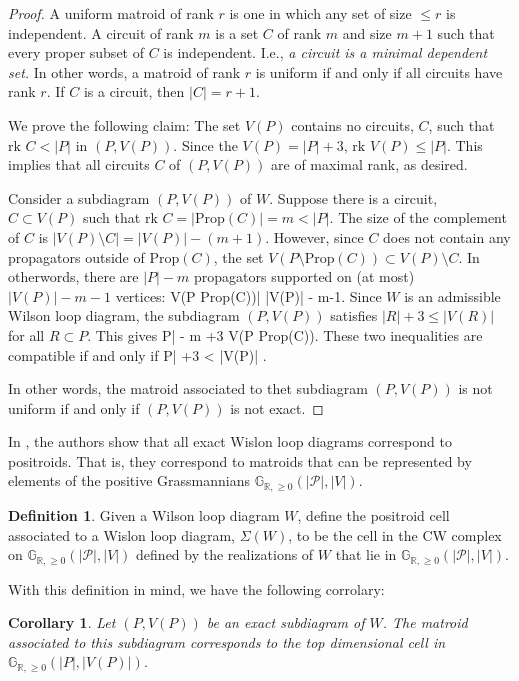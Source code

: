 \documentclass[11pt]{article}
\newcommand{\R}{\mathbb{R}}
\newcommand{\Gr}{\mathbb{G}_{\R, \geq 0}}
\newcommand{\rk}{\textrm{rk }}
\def\bas #1\eas{\begin{align*} #1 \end{align*}}
\newcommand{\cP}{\mathcal{P}}
\newcommand{\Prop}{\textrm{Prop}}
\newtheorem{cor}[thm]{Corollary}
\theoremstyle{remark}
\theoremstyle{definition}
\newtheorem{dfn}[thm]{Definition}
\begin{document}
\begin{proof}
A uniform matroid of rank $r$ is one in which any set of size $ \leq r$ is independent. A circuit of rank $m$ is a set $C$ of rank $m$ and size $m+1$ such that every proper subset of $C$ is independent. I.e., \emph{a circuit is a minimal dependent set.} In other words, a matroid of rank $r$ is uniform if and only if all circuits have rank $r$. If $C$ is a circuit, then $|C| = r+1$.

We prove the following claim: The set $V(P)$ contains no circuits, $C$, such that  $\rk C< |P|$ in $(P, V(P))$. Since the $V(P) = |P|+3$, $\rk V(P) \leq |P|$. This implies that all circuits $C$ of $(P, V(P))$ are of maximal rank, as desired.

Consider a subdiagram $(P, V(P))$ of $W$. Suppose there is a circuit, $C \subset V(P)$ such that $\rk C = |\Prop (C) | = m < |P|$. The size of the complement of $C$ is $|V(P) \setminus C| = |V(P)| -(m+1)$. However, since $C$ does not contain any propagators outside of $\Prop (C)$, the set $V(P \setminus \Prop(C)) \subset V(P )\setminus C$. In otherwords, there are $|P| - m$ propagators supported on (at most) $|V(P)|-m -1$ vertices: \bas |V(P \setminus \Prop (C))| \leq |V(P)| - m-1\;. \eas Since $W$ is an admissible Wilson loop diagram, the subdiagram $(P, V(P))$ satisfies $|R| +3 \leq |V(R)|$ for all $R \subset P$.  This gives \bas |P| - m +3 \leq V(P \setminus \Prop(C))\;. \eas These two inequalities are compatible if and only if \bas |P| +3 < |V(P)| \;. \eas

In other words, the matroid associated to thet subdiagram $(P, V(P))$ is not uniform if and only if $(P, V(P))$ is not exact.
\end{proof}

In \cite{wilsonloops}, the authors show that all exact Wislon loop diagrams correspond to positroids. That is, they correspond to matroids that can be represented by elements of the positive Grassmannians $\Gr(|\cP|, |V|)$.

\begin{dfn}
Given a Wilson loop diagram $W$, define the positroid cell associated to a Wislon loop diagram, $\Sigma(W)$, to be the cell in the CW complex on $\Gr(|\cP|, |V|)$ defined by the realizations of $W$ that lie in $\Gr(|\cP|, |V|)$.
\end{dfn}

With this definition in mind, we have the following corrolary:

\begin{cor}
Let $(P, V(P))$ be an exact subdiagram of $W$. The matroid associated to this subdiagram corresponds to the top dimensional cell in $\Gr(|P|, |V(P)|)$.
\end{cor}
\end{document}
